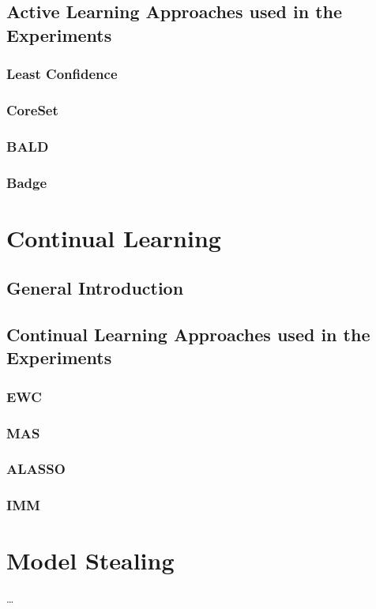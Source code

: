 \subsection{Active Learning Approaches used in the Experiments}
\subsubsection{Least Confidence}
\subsubsection{CoreSet}
\subsubsection{BALD}
\subsubsection{Badge}

\section{Continual Learning}
\label{sec:Related_work:Continual_Learning}

\subsection{General Introduction}
\subsection{Continual Learning Approaches used in the Experiments}
\subsubsection{EWC}
\subsubsection{MAS}
\subsubsection{ALASSO}
\subsubsection{IMM}



\section{Model Stealing}
\label{sec:Related_work:Model_Stealing}

\dots
